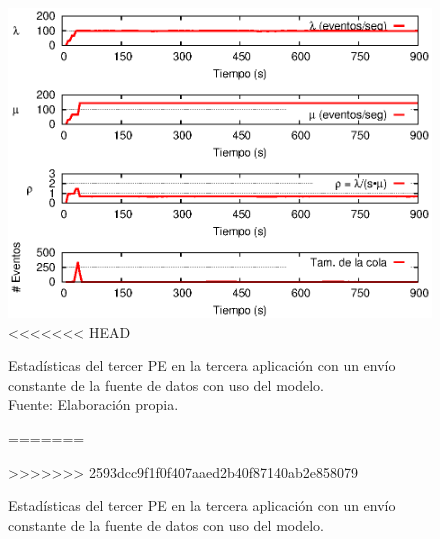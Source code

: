 \begin{figure}[!htp]
    \centering
    \captionsetup{justification=centering}
    \includegraphics[scale=1]{images/exp/app3/cm/logical/statusThreePE.eps}
<<<<<<< HEAD
    \caption[Estadísticas del tercer PE en la tercera aplicación con un envío constante de la fuente de datos con uso del modelo.]{Estadísticas del tercer PE en la tercera aplicación con un envío constante de la fuente de datos con uso del modelo.\\Fuente: Elaboración propia.}
=======
    \caption{Estad\'isticas del tercer PE en la tercera aplicaci\'on con un env\'io constante de la fuente de datos con uso del modelo.}
>>>>>>> 2593dcc9f1f0f407aaed2b40f87140ab2e858079
    \label{fig:app3-statusThreePE-cm}
\end{figure}

